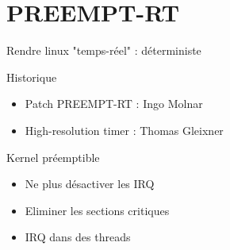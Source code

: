 \section{PREEMPT-RT}
\begin{frame}
Rendre linux "temps-réel" : déterministe
\begin{block}{Historique}
\begin{itemize}
	\item Patch PREEMPT-RT : Ingo Molnar
	\item High-resolution timer : Thomas Gleixner
\end{itemize}
\end{block}
\begin{block}{Kernel préemptible}
\begin{itemize}
	\item Ne plus désactiver les IRQ
	\item Eliminer les sections critiques %
	\item IRQ dans des threads
\end{itemize}
\end{block}

\end{frame}

